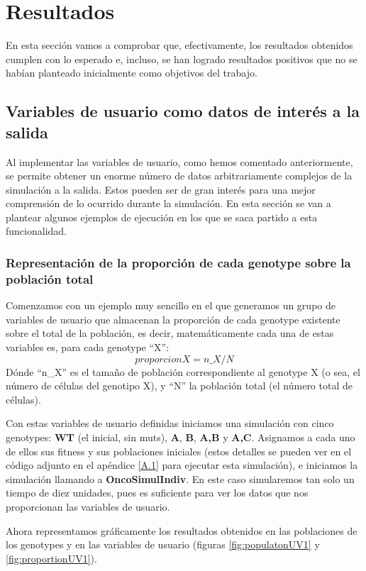 \section{Resultados}\label{5.3}

En esta sección vamos a comprobar que, efectivamente, los resultados obtenidos cumplen con lo esperado e, incluso, se han logrado resultados positivos que no se habían planteado inicialmente como objetivos del trabajo.

\subsection{Variables de usuario como datos de interés a la salida}\label{5.3.1}
Al implementar las variables de usuario, como hemos comentado anteriormente, se permite obtener un enorme número de datos arbitrariamente complejos de la simulación a la salida. Estos pueden ser de gran interés para una mejor comprensión de lo ocurrido durante la simulación. En esta sección se van a plantear algunos ejemplos de ejecución en los que se saca partido a esta funcionalidad.

\subsubsection{Representación de la proporción de cada \gls{genotype} sobre la población total}\label{5.3.1.1}
Comenzamos con un ejemplo muy sencillo en el que generamos un grupo de variables de usuario que almacenan la proporción de cada \gls{genotype} existente sobre el total de la población, es decir, matemáticamente cada una de estas variables es, para cada \gls{genotype} ``X'':
$$proporcionX = n\_X/N$$
Dónde ``n\_X'' es el tamaño de población correspondiente al \gls{genotype} X (o sea, el número de células del genotipo X), y ``N'' la población total (el número total de células).

Con estas variables de usuario definidas iniciamos una simulación con cinco \glspl{genotype}: \textbf{WT} (el inicial, sin \glspl{mut}), \textbf{A}, \textbf{B}, \textbf{A,B} y \textbf{A,C}. Asignamos a cada uno de ellos sus \gls{fitness} y sus poblaciones iniciales (estos detalles se pueden ver en el código adjunto en el apéndice \ref{A.1} para ejecutar esta simulación), e iniciamos la simulación llamando a \textbf{OncoSimulIndiv}. En este caso simularemos tan solo un tiempo de diez unidades, pues es suficiente para ver los datos que nos proporcionan las variables de usuario.

Ahora representamos gráficamente los resultados obtenidos en las poblaciones de los \glspl{genotype} y en las variables de usuario (figuras \ref{fig:populatonUV1} y \ref{fig:proportionUV1}).


